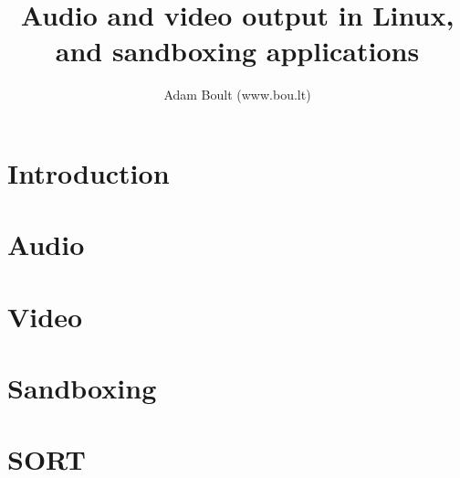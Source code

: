 \documentclass[oneside]{book}
\begin{document}
\author{Adam Boult (www.bou.lt)}
\title{Audio and video output in Linux, and sandboxing applications}
\maketitle

\setcounter{tocdepth}{0}
\tableofcontents



\part{Introduction}

\part{Audio}


\part{Video}


\part{Sandboxing}


\part{SORT}

\end{document}
